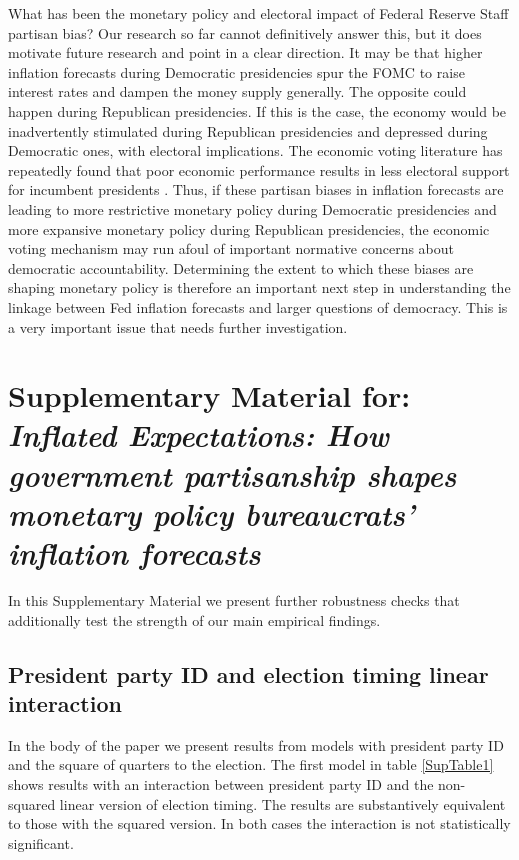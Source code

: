 \documentclass[a4paper]{article}
\begin{document}
What has been the monetary policy and electoral impact of Federal Reserve Staff partisan bias? Our research so far cannot definitively answer this, but it does motivate future research and point in a clear direction. It may be that higher inflation forecasts during Democratic presidencies spur the FOMC to raise interest rates and dampen the money supply generally. The opposite could happen during Republican presidencies. If this is the case, the economy would be inadvertently stimulated during Republican presidencies and depressed during Democratic ones, with electoral implications. The economic voting literature has repeatedly found that poor economic performance results in less electoral support for incumbent presidents \citep[e.g.][]{Alvarez1998, Bloom1975, LewisBeck1988, Powell1993}. Thus, if these partisan biases in inflation forecasts are leading to more restrictive monetary policy during Democratic presidencies and more expansive monetary policy during Republican presidencies, the economic voting mechanism may run afoul of important normative concerns about democratic accountability. Determining the extent to which these biases are shaping monetary policy is therefore an important next step in understanding the linkage between Fed inflation forecasts and larger questions of democracy. This is a very important issue that needs further investigation.


\clearpage





\clearpage

\section*{Supplementary Material for:\\ \emph{Inflated Expectations: How government partisanship shapes monetary policy bureaucrats' inflation forecasts}}

In this Supplementary Material we present further robustness checks that additionally test the strength of our main empirical findings. 

\subsection*{President party ID and election timing linear interaction}

In the body of the paper we present results from models with president party ID and the square of quarters to the election. The first model in table \ref{SupTable1} shows results with an interaction between president party ID and the non-squared linear version of election timing. The results are substantively equivalent to those with the squared version. In both cases the interaction is not statistically significant. 
\end{document}
